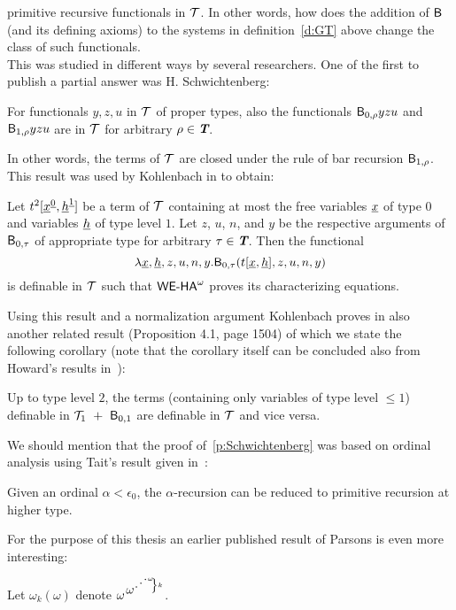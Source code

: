 primitive recursive functionals in $\mathcal{T}$. In other words, how does
the addition of $\textsf{\upshape B}$ (and its defining axioms) to the systems
in definition~\ref{d:GT} above change the class of such functionals.\\
This was studied in different ways by several researchers. One of the first
to publish a partial answer was H. Schwichtenberg:
\begin{prop}\label{p:Schwichtenberg}
For functionals $y,z,u$ in $\mathcal{T}$ of proper types, also
the functionals $\textsf{\upshape B}_{0,\rho}yzu$ and $\textsf{\upshape B}_{1,\rho}yzu$ are in $\mathcal{T}$ for arbitrary $\rho\in\emph{\protect\textbf{T}}$.
\end{prop}
In other words, the terms of $\mathcal{T}$ are closed under the rule of
bar recursion $\textsf{\upshape B}_{1,\rho}$. 
%
This result was used by Kohlenbach in \cite{Kohlenbach99} to obtain:
\begin{prop}\label{p:KohBR0r}
Let $t^2[\underline x^{\underline 0}, \underline h^{\underline 1}]$ be a term of $\mathcal{T}$ 
containing at most the free variables $\underline x$ of type $0$
and variables $\underline h$ of type level $1$. Let $z$, $u$, $n$, and $y$
be the respective arguments of $\textsf{\upshape B}_{0,\tau}$ of appropriate type for arbitrary
$\tau\in\emph{\protect\textbf{T}}$. Then the functional
\[
\lambda \underline x,\underline h,z,u,n,y.\textsf{\upshape B}_{0,\tau}(t[\underline x, \underline h],z,u,n,y)
\]
is definable in $\mathcal{T}$ such that ${\textsf{\upshape WE-HA}}^{\omega}$ proves its 
characterizing equations. 
\end{prop}
%
Using this result and a normalization argument Kohlenbach proves 
in \cite{Kohlenbach99} also another related result (Proposition 4.1, page 1504)
of which we state the following corollary (note that the corollary itself
can be concluded also from Howard's results in~\cite{Howard81}):
\begin{cor}\label{c:TBT}
Up to type level $2$, the terms (containing only variables of type level $\leq\!1$)
definable in $\mathcal{T}_1\ +\ \textsf{\upshape B}_{0,1}$ are definable in 
$\mathcal{T}$ and vice versa.
\end{cor}
%
We should mention that the proof of~\ref{p:Schwichtenberg} was based on ordinal analysis using Tait's result
given in~\cite{Tait76}:
\begin{prop}\label{p:Tait}
Given an ordinal $\alpha\!<\!\epsilon_0$, the $\alpha$-recursion can be reduced
to primitive recursion at higher type.
\end{prop}
%
For the purpose of this thesis an earlier published result 
of Parsons is even more interesting:
\begin{dfn}
Let $\omega_{k}(\omega)$ denote 
$\omega^{^{
  \left.
  \begin{minipage}{4.7ex} 
    $\omega^{\Ddots^\omega} $
  \end{minipage}
  \right\rbrace k
}}$.
\end{dfn}
